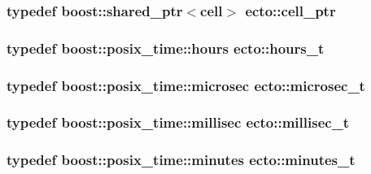 \subsubsection[{\texorpdfstring{cell\+\_\+ptr}{cell_ptr}}]{\setlength{\rightskip}{0pt plus 5cm}typedef boost\+::shared\+\_\+ptr$<${\bf cell}$>$ {\bf ecto\+::cell\+\_\+ptr}}\hypertarget{namespaceecto_aed1809e82b9229ea81ef9ee3438cf62c}{}\label{namespaceecto_aed1809e82b9229ea81ef9ee3438cf62c}
\subsubsection[{\texorpdfstring{hours\+\_\+t}{hours_t}}]{\setlength{\rightskip}{0pt plus 5cm}typedef boost\+::posix\+\_\+time\+::hours {\bf ecto\+::hours\+\_\+t}}\hypertarget{namespaceecto_a477c167c1e1288b689db5872f650540e}{}\label{namespaceecto_a477c167c1e1288b689db5872f650540e}
\subsubsection[{\texorpdfstring{microsec\+\_\+t}{microsec_t}}]{\setlength{\rightskip}{0pt plus 5cm}typedef boost\+::posix\+\_\+time\+::microsec {\bf ecto\+::microsec\+\_\+t}}\hypertarget{namespaceecto_affe36dc8be6d20a6b8f7359655c8dc23}{}\label{namespaceecto_affe36dc8be6d20a6b8f7359655c8dc23}
\subsubsection[{\texorpdfstring{millisec\+\_\+t}{millisec_t}}]{\setlength{\rightskip}{0pt plus 5cm}typedef boost\+::posix\+\_\+time\+::millisec {\bf ecto\+::millisec\+\_\+t}}\hypertarget{namespaceecto_ab1f4721cc3b311f9615b3092d291260b}{}\label{namespaceecto_ab1f4721cc3b311f9615b3092d291260b}
\subsubsection[{\texorpdfstring{minutes\+\_\+t}{minutes_t}}]{\setlength{\rightskip}{0pt plus 5cm}typedef boost\+::posix\+\_\+time\+::minutes {\bf ecto\+::minutes\+\_\+t}}\hypertarget{namespaceecto_ad57e5ebf1455dd895ce11804e47669e5}{}\label{namespaceecto_ad57e5ebf1455dd895ce11804e47669e5}
